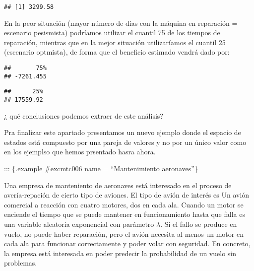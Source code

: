 \documentclass[
]{book}
\newenvironment{Shaded}{\begin{snugshade}}{\end{snugshade}}
\newcommand{\DecValTok}[1]{\textcolor[rgb]{0.00,0.00,0.81}{#1}}
\newcommand{\NormalTok}[1]{#1}
\newcommand{\SpecialCharTok}[1]{\textcolor[rgb]{0.00,0.00,0.00}{#1}}
\theoremstyle{definition}
\theoremstyle{definition}
\theoremstyle{definition}
\theoremstyle{definition}
\theoremstyle{remark}
\begin{document}
\begin{verbatim}
## [1] 3299.58
\end{verbatim}

En la peor situación (mayor número de días con la máquina en reparación = escenario pesismista) podríamos utilizar el cuantil 75 de los tiempos de reparación, mientras que en la mejor situación utilizaríamos el cuantil 25 (escenario optmista), de forma que el beneficio estimado vendrá dado por:

\begin{Shaded}
\end{Shaded}

\begin{verbatim}
##       75% 
## -7261.455
\end{verbatim}

\begin{Shaded}
\end{Shaded}

\begin{verbatim}
##      25% 
## 17559.92
\end{verbatim}

¿ qué conclusiones podemos extraer de este análisis?

Pra finalizar este apartado presentamos un nuevo ejemplo donde el espacio de estados está compuesto por una pareja de valores y no por un único valor como en los ejemplso que hemos prsentado hasra ahora.

::: \{.example \#excmtc006 name = ``Mantenimiento aeronaves''\}

Una empresa de manteniento de aeronaves está interesado en el proceso de avería-repación de cierto tipo de aviones. El tipo de avión de interés es Un avión comercial a reacción con cuatro motores, dos en cada ala. Cuando un motor se enciende el tiempo que se puede mantener en funcionamiento hasta que falla es una variable aleatoria exponencial con parámetro \(\lambda\). Si el fallo se produce en vuelo, no puede haber reparación, pero el avión necesita al menos un motor en cada ala para funcionar correctamente y poder volar con seguridad. En concreto, la empresa está interesada en poder predecir la probabilidad de un vuelo sin problemas.
\end{document}
